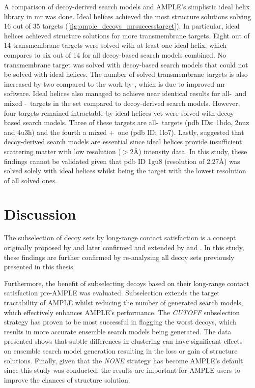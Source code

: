 A comparison of decoy-derived search models and AMPLE's simplistic ideal helix library \cite{Thomas2015-wu} in \gls{mr} was done. Ideal helices achieved the most structure solutions solving 16 out of 35 targets (\cref{fig:ample_decoys_mrsuccesstarget}). In particular, ideal helices achieved structure solutions for more transmembrane targets. Eight out of 14 transmembrane targets were solved with at least one ideal helix, which compares to six out of 14 for all decoy-based search models combined. No transmembrane target was solved with decoy-based search models that could not be solved with ideal helices. The number of solved transmembrane targets is also increased by two compared to the work by \textcite{Thomas2017-sh}, which is due to improved \gls{mr} software. Ideal helices also managed to achieve near identical results for all-\textalpha\ and mixed \textalpha-\textbeta\ targets in the set compared to decoy-derived search models. However, four targets remained intractable by ideal helices yet were solved with decoy-based search models. Three of these targets are all-\textbeta\ targets (\gls{pdb} IDs: 1bdo, 2nuz and 4u3h) and the fourth a mixed \textalpha+\textbeta\ one (\gls{pdb} ID: 1lo7). Lastly, \textcite{Thomas2017-sh} suggested that decoy-derived search models are essential since ideal helices provide insufficient scattering matter with low resolution ($>2$\AA) intensity data. In this study, these findings cannot be validated given that \gls{pdb} ID 1gu8 (resolution of 2.27\AA) was solved solely with ideal helices whilst being the target with the lowest resolution of all solved ones.

\section{Discussion}
The subselection of decoy sets by long-range contact satisfaction is a concept originally proposed by \textcite{Kosciolek2014-bt} and later confirmed and extended by \textcite{De_Oliveira2017-gj} and \textcite{Adhikari2018-lj}. In this study, these findings are further confirmed by re-analysing all decoy sets previously presented in this thesis. 

Furthermore, the benefit of subselecting decoys based on their long-range contact satisfaction pre-AMPLE was evaluated. Subselection extends the target tractability of AMPLE whilst reducing the number of generated search models, which effectively enhances AMPLE's performance. The \textit{CUTOFF} subselection strategy has proven to be most successful in flagging the worst decoys, which results in more accurate ensemble search models being generated. The data presented shows that subtle differences in clustering can have significant effects on ensemble search model generation resulting in the loss or gain of structure solutions. Finally, given that the \textit{NONE} strategy has become AMPLE's default since this study was conducted, the results are important for AMPLE users to improve the chances of structure solution. 

